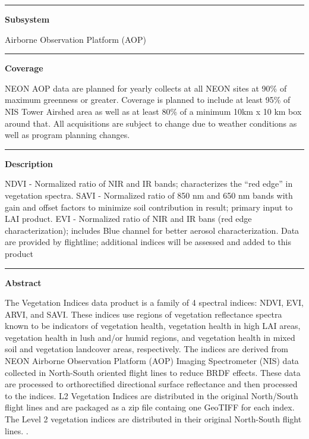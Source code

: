 \documentclass[]{article}
\begin{document}
\begin{center}\rule{0.5\linewidth}{\linethickness}\end{center}

\textbf{Subsystem}

Airborne Observation Platform (AOP)

\begin{center}\rule{0.5\linewidth}{\linethickness}\end{center}

\textbf{Coverage}

NEON AOP data are planned for yearly collects at all NEON sites at 90\%
of maximum greenness or greater. Coverage is planned to include at least
95\% of NIS Tower Airshed area as well as at least 80\% of a minimum
10km x 10 km box around that. All acquisitions are subject to change due
to weather conditions as well as program planning changes.

\begin{center}\rule{0.5\linewidth}{\linethickness}\end{center}

\textbf{Description}

NDVI - Normalized ratio of NIR and IR bands; characterizes the ``red
edge'' in vegetation spectra. SAVI - Normalized ratio of 850 nm and 650
nm bands with gain and offset factors to minimize soil contribution in
result; primary input to LAI product. EVI - Normalized ratio of NIR and
IR bans (red edge characterization); includes Blue channel for better
aerosol characterization. Data are provided by flightline; additional
indices will be assessed and added to this product

\begin{center}\rule{0.5\linewidth}{\linethickness}\end{center}

\textbf{Abstract}

The Vegetation Indices data product is a family of 4 spectral indices:
NDVI, EVI, ARVI, and SAVI. These indices use regions of vegetation
reflectance spectra known to be indicators of vegetation health,
vegetation health in high LAI areas, vegetation health in lush and/or
humid regions, and vegetation health in mixed soil and vegetation
landcover areas, respectively. The indices are derived from NEON
Airborne Observation Platform (AOP) Imaging Spectrometer (NIS) data
collected in North-South oriented flight lines to reduce BRDF effects.
These data are processed to orthorectified directional surface
reflectance and then processed to the indices. L2 Vegetation Indices are
distributed in the original North/South flight lines and are packaged as
a zip file containg one GeoTIFF for each index. The Level 2 vegetation
indices are distributed in their original North-South flight lines.
\newpage
.
\end{document}
